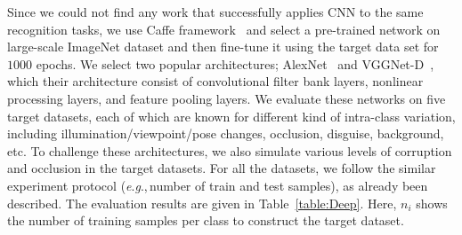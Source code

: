 \documentclass[journal]{IEEEtran}
\newcommand{\eg}{\textit{e}.\textit{g}.,\,}
\begin{document}
Since we could not find any work that successfully applies CNN to the same recognition tasks, we use Caffe framework~\cite{Caffe} and select a pre-trained network on large-scale ImageNet dataset and then fine-tune it using the target data set for $1000$ epochs. We select two popular architectures; AlexNet~\cite{Alex-Net} and VGGNet-D~\cite{VGG-Net}, which their architecture consist of convolutional filter bank layers, nonlinear processing layers, and feature pooling layers. We evaluate these networks on five target datasets, each of which are known for different kind of intra-class variation, including illumination/viewpoint/pose changes, occlusion, disguise, background, etc. To challenge these architectures, we also simulate various levels of corruption and occlusion in the target datasets. For all the datasets, we follow the similar experiment protocol (\eg number of train and test samples), as already been described. The evaluation results are given in Table~\ref{table:Deep}. Here, $n_i$ shows the number of training samples per class to construct the target dataset.
\end{document}
